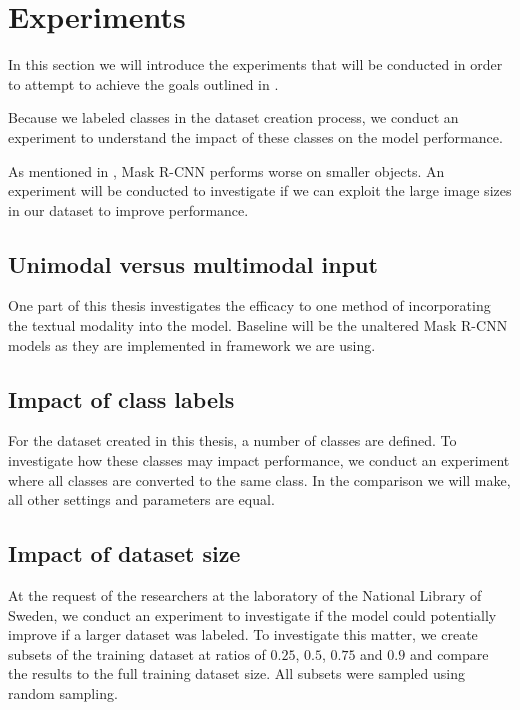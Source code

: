 \documentclass[oneside, english, bibtex]{kththesis}
\begin{document}
\clearpage

\section{Experiments}
\label{sec:experiments}

In this section we will introduce the experiments that will be conducted in order to attempt to achieve the goals outlined in .

Because we labeled classes in the dataset creation process, we conduct an experiment to understand the impact of these classes on the model performance.

As mentioned in , Mask R-CNN performs worse on smaller objects. An experiment will be conducted to investigate if we can exploit the large image sizes in our dataset to improve performance.


\subsection{Unimodal versus multimodal input}

One part of this thesis investigates the efficacy to one method of incorporating the textual modality into the model.
Baseline will be the unaltered Mask R-CNN models as they are implemented in framework we are using.

\subsection{Impact of class labels}

For the dataset created in this thesis, a number of classes are defined.
To investigate how these classes may impact performance, we conduct an experiment where all classes are converted to the same class.
In the comparison we will make, all other settings and parameters are equal.

\subsection{Impact of dataset size}

At the request of the researchers at the laboratory of the National Library of Sweden, we conduct an experiment to investigate if the model could potentially improve if a larger dataset was labeled. To investigate this matter, we create subsets of the training dataset at ratios of $0.25$, $0.5$, $0.75$ and $0.9$ and compare the results to the full training dataset size. All subsets were sampled using random sampling.
\end{document}
